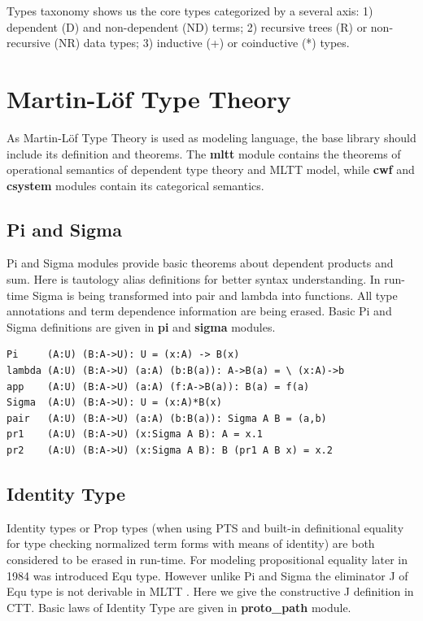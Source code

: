 \documentclass{article}
\begin{document}
Types taxonomy shows us the core types categorized by a several axis:
1) dependent (D) and non-dependent (ND) terms;
2) recursive trees (R) or non-recursive (NR) data types;
3) inductive (+) or coinductive (*) types.

\section{Martin-Löf Type Theory}

As Martin-Löf Type Theory is used as modeling language,
the base library should include its definition and theorems.
The {\bf mltt} module contains the theorems of operational semantics of
dependent type theory and MLTT model, while {\bf cwf} and {\bf csystem}
modules contain its categorical semantics.

\subsection{Pi and Sigma}

Pi and Sigma modules provide basic theorems about dependent products and sum.
Here is tautology alias definitions for better syntax understanding.
In run-time Sigma is being transformed into pair and lambda into functions.
All type annotations and term dependence information are being erased.
Basic Pi and Sigma definitions are given in {\bf pi} and {\bf sigma} modules.

\begin{lstlisting}[mathescape=true]
Pi     (A:U) (B:A->U): U = (x:A) -> B(x)
lambda (A:U) (B:A->U) (a:A) (b:B(a)): A->B(a) = \ (x:A)->b
app    (A:U) (B:A->U) (a:A) (f:A->B(a)): B(a) = f(a)
Sigma  (A:U) (B:A->U): U = (x:A)*B(x)
pair   (A:U) (B:A->U) (a:A) (b:B(a)): Sigma A B = (a,b)
pr1    (A:U) (B:A->U) (x:Sigma A B): A = x.1
pr2    (A:U) (B:A->U) (x:Sigma A B): B (pr1 A B x) = x.2
\end{lstlisting}

\subsection{Identity Type}

Identity types or Prop types (when using PTS and built-in definitional equality for type checking
normalized term forms with means of identity) are both considered to be erased in run-time.
For modeling propositional equality later in 1984 was introduced Equ type. \cite{Lof84}
However unlike Pi and Sigma the eliminator J of Equ type is
not derivable in MLTT \cite{Hofmann96, Mortberg17, HoTT}.
Here we give the constructive J definition in CTT. Basic laws of Identity Type
are given in {\bf proto\_path} module.
\end{document}
